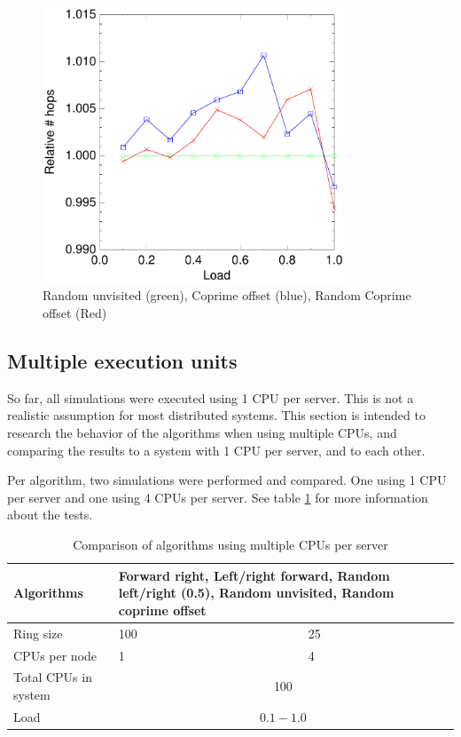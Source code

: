 \documentclass[10pt,a4paper]{article}
\begin{document}
\begin{figure}[h!tb]
\centering
\includegraphics[width=0.8\textwidth]{data/randunvisited_prime_randprime.pdf}
\caption{Random unvisited (green), Coprime offset (blue), Random Coprime offset (Red)}
\label{figrandunvisited}
\end{figure}



\subsection{Multiple execution units}
So far, all simulations were executed using 1 CPU per server. This is not a realistic assumption for most distributed systems. This section is intended to research the behavior of the algorithms when using multiple CPUs, and comparing the results to a system with 1 CPU per server, and to each other.

Per algorithm, two simulations were performed and compared. One using 1 CPU per server and one using 4 CPUs per server. See table \ref{tabcpus} for more information about the tests.

\begin{table}[h!]
\centering
\begin{tabular}{|p{}|p{}|p{}|} \hline
Algorithms & \multicolumn{2}{|p{0.7\textwidth}|}{Forward right, Left/right forward, Random left/right (0.5), Random unvisited, Random coprime offset} \\ \hline
Ring size & 100 & 25 \\ \hline
CPUs per node	& 1 & 4 \\ \hline
Total CPUs in system & \multicolumn{2}{|c|}{100} \\ \hline
Load	& \multicolumn{2}{|c|}{$0.1 - 1.0$} \\ \hline
\end{tabular}
\caption{Comparison of algorithms using multiple CPUs per server}
\label{tabcpus}
\end{table}
\end{document}
